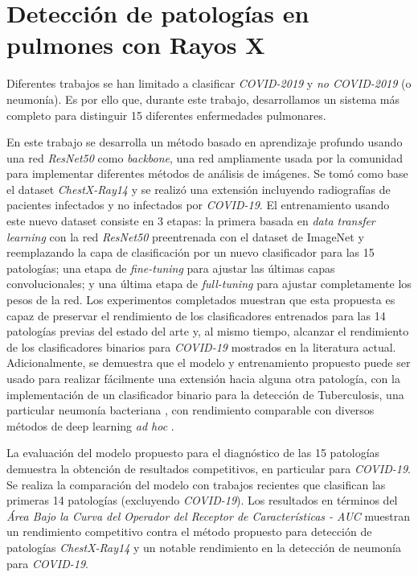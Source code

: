 \section{Detección de patologías en pulmones con Rayos X}

Diferentes trabajos se han limitado a clasificar \textit{COVID-2019} y \textit{no COVID-2019} (o
neumonía). Es por ello que, durante este trabajo, desarrollamos un sistema más completo para
distinguir 15 diferentes enfermedades pulmonares.

En este trabajo se desarrolla un método basado en aprendizaje profundo usando una red
\textit{ResNet50} como \textit{backbone}, una red ampliamente usada por la comunidad para implementar
diferentes métodos de análisis de imágenes. Se tomó como base el dataset \textit{ChestX-Ray14} y se
realizó una extensión incluyendo radiografías de pacientes infectados y no infectados por
\textit{COVID-19}. El entrenamiento usando este nuevo dataset consiste en 3 etapas: la primera basada
en \textit{data transfer learning} con la red \textit{ResNet50} preentrenada con el dataset de
ImageNet y reemplazando la capa de clasificación por un nuevo clasificador para las 15 patologías;
una etapa de \textit{fine-tuning} para ajustar las últimas capas convolucionales; y una última etapa
de \textit{full-tuning} para ajustar completamente los pesos de la red. Los experimentos completados
muestran que esta propuesta es capaz de preservar el rendimiento de los clasificadores entrenados
para las 14 patologías previas del estado del arte y, al mismo tiempo, alcanzar el rendimiento de los
clasificadores binarios para \textit{COVID-19} mostrados en la literatura actual. Adicionalmente, se
demuestra que el modelo y entrenamiento propuesto puede ser usado para realizar fácilmente una
extensión hacia alguna otra patología, con la implementación de un clasificador binario para la
detección de Tuberculosis, una particular neumonía bacteriana \cite{stirenko2018chest}, con
rendimiento comparable con diversos métodos de deep learning \emph{ad hoc} \cite{puttagunta2021detection}.


La evaluación del modelo propuesto para el diagnóstico de las 15 patologías demuestra la obtención de
resultados competitivos, en particular para \textit{COVID-19}. Se realiza la comparación del modelo
con trabajos recientes que clasifican las primeras 14 patologías (excluyendo \textit{COVID-19}). Los
resultados en términos del \textit{Área Bajo la Curva del Operador del Receptor de Características - AUC}
muestran un rendimiento competitivo contra el método propuesto para detección de patologías
\textit{ChestX-Ray14} y un notable rendimiento en la detección de neumonía para \textit{COVID-19}.

